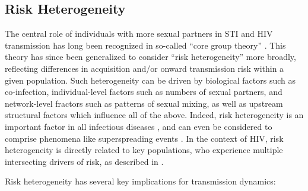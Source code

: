 \subsection{Risk Heterogeneity}\label{intro.model.het}
The central role of individuals with more sexual partners in STI and HIV transmission
has long been recognized in so-called ``core group theory'' \cite{Yorke1978,Stigum1994,Watts2010}.
This theory has since been generalized to consider ``risk heterogeneity'' more broadly,
reflecting differences in acquisition and/or onward transmission risk within a given population.
Such heterogeneity can be driven by
biological factors such as co-infection,
individual-level factors such as numbers of sexual partners, and
network-level fractors such as patterns of sexual mixing,
as well as upstream structural factors which influence all of the above. %
Indeed, risk heterogeneity is an important factor in all infectious diseases \cite{Suen2017},
and can even be considered to comprise phenomena like superspreading events \cite{Lloyd-Smith2005}.
In the context of HIV, risk heterogeneity is directly related to key populations,
who experience multiple intersecting drivers of risk, as described in .
\par
Risk heterogeneity has several key implications for transmission dynamics:

